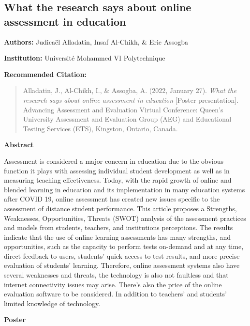 \documentclass[
]{book}
\begin{document}
\newpage

\hypertarget{what-the-research-says-about-online-assessment-in-education}{%
\subsection{What the research says about online assessment in education}\label{what-the-research-says-about-online-assessment-in-education}}

\textbf{Authors:} Judicaël Alladatin, Insaf Al-Chikh, \& Eric Assogba

\textbf{Institution:} Université Mohammed VI Polytechnique

\textbf{Recommended Citation:}

\begin{quote}
Alladatin, J., Al-Chikh, I., \& Assogba, A. (2022, January 27). \emph{What the research says about online assessment in education} {[}Poster presentation{]}. Advancing Assessment and Evaluation Virtual Conference: Queen's University Assessment and Evaluation Group (AEG) and Educational Testing Services (ETS), Kingston, Ontario, Canada.
\end{quote}

\textbf{Abstract}

Assessment is considered a major concern in education due to the obvious function it plays with assessing individual student development as well as in measuring teaching effectiveness. Today, with the rapid growth of online and blended learning in education and its implementation in many education systems after COVID 19, online assessment has created new issues specific to the assessment of distance student performance. This article proposes a Strengths, Weaknesses, Opportunities, Threats (SWOT) analysis of the assessment practices and models from students, teachers, and institutions perceptions. The results indicate that the use of online learning assessments has many strengths, and opportunities, such as the capacity to perform tests on-demand and at any time, direct feedback to users, students' quick access to test results, and more precise evaluation of students' learning. Therefore, online assessment systems also have several weaknesses and threats, the technology is also not faultless and that internet connectivity issues may arise. There's also the price of the online evaluation software to be considered. In addition to teachers' and students' limited knowledge of technology.

\textbf{Poster}
\end{document}
